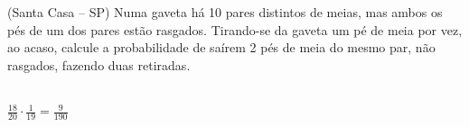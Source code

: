 \begin{ex}
(Santa Casa – SP) Numa gaveta há 10 pares distintos de meias, mas ambos os pés de um dos pares estão rasgados. Tirando-se da gaveta um pé de meia por vez, ao acaso, calcule a probabilidade de saírem 2 pés de meia do mesmo par, não rasgados, fazendo duas retiradas.
   \begin{sol}
    \phantom{A} \\
     $\frac{18}{20}\cdot\frac{1}{19}=\frac{9}{190}$
   \end{sol}
\end{ex}